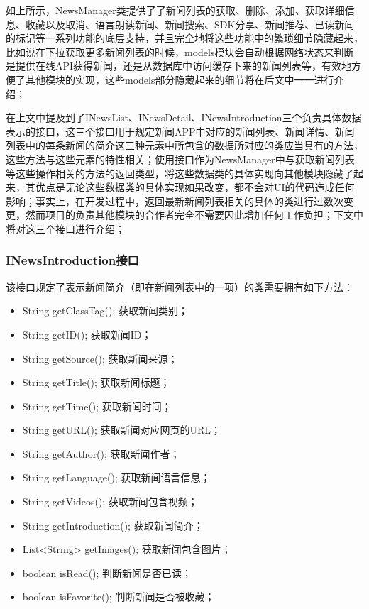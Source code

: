 \documentclass[UTF8]{ctexart}
\begin{document}
	如上所示，NewsManager类提供了了新闻列表的获取、删除、添加、获取详细信息、收藏以及取消、语言朗读新闻、新闻搜索、SDK分享、新闻推荐、已读新闻的标记等一系列功能的底层支持，并且完全地将这些功能中的繁琐细节隐藏起来，比如说在下拉获取更多新闻列表的时候，models模块会自动根据网络状态来判断是提供在线API获得新闻，还是从数据库中访问缓存下来的新闻列表等，有效地方便了其他模块的实现，这些models部分隐藏起来的细节将在后文中一一进行介绍；

	在上文中提及到了INewsList、INewsDetail、INewsIntroduction三个负责具体数据表示的接口，这三个接口用于规定新闻APP中对应的新闻列表、新闻详情、新闻列表中的每条新闻的简介这三种元素中所包含的数据所对应的类应当具有的方法，这些方法与这些元素的特性相关；使用接口作为NewsManager中与获取新闻列表等这些操作相关的方法的返回类型，将这些数据类的具体实现向其他模块隐藏了起来，其优点是无论这些数据类的具体实现如果改变，都不会对UI的代码造成任何影响；事实上，在开发过程中，返回最新新闻列表相关的具体的类进行过数次变更，然而项目的负责其他模块的合作者完全不需要因此增加任何工作负担；下文中将对这三个接口进行介绍；

	\subsubsection{INewsIntroduction接口}
		该接口规定了表示新闻简介（即在新闻列表中的一项）的类需要拥有如下方法：

		\begin{itemize}
			\item String getClassTag(); 获取新闻类别；
			\item String getID(); 获取新闻ID；
 			\item String getSource(); 获取新闻来源；
  		  	\item String getTitle(); 获取新闻标题；
   		 	\item String getTime(); 获取新闻时间；
  	   		\item String getURL(); 获取新闻对应网页的URL；
   	 		\item String getAuthor(); 获取新闻作者；
   	 		\item String getLanguage(); 获取新闻语言信息；
   	 		\item String getVideos(); 获取新闻包含视频；
    			\item String getIntroduction(); 获取新闻简介；
			\item List<String> getImages(); 获取新闻包含图片；
			\item boolean isRead(); 判断新闻是否已读；
			\item boolean isFavorite(); 判断新闻是否被收藏；
		\end{itemize}
\end{document}
